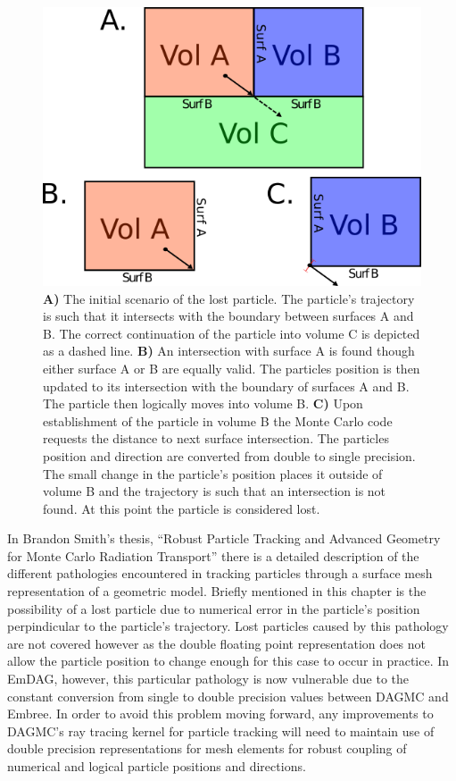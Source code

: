 \documentclass[12pt, a4paper]{article}
\begin{document}
\begin{figure}
  \begin{centering}
    \includegraphics[scale=0.7]{emdag_lost.png}
    \caption{\textbf{A)} The initial scenario of the lost particle. The particle's trajectory is such that it intersects with the boundary between surfaces A and B. The correct continuation of the particle into volume C is depicted as a dashed line. \textbf{B)} An intersection with surface A is found though either surface A or B are equally valid. The particles position is then updated to its intersection with the boundary of surfaces A and B. The particle then logically moves into volume B. \textbf{C)} Upon establishment of the particle in volume B the Monte Carlo code requests the distance to next surface intersection. The particles position and direction are converted from double to single precision. The small change in the particle's position places it outside of volume B and the trajectory is such that an intersection is not found. At this point the particle is considered lost.}
    \label{emdag-lost-particles}
  \end{centering}
  \end{figure}

In Brandon Smith's thesis, ``Robust Particle Tracking and Advanced Geometry for Monte Carlo Radiation Transport'' \cite{Smith_2011} there is a detailed description of the different pathologies encountered in tracking particles through a surface mesh representation of a geometric model. Briefly mentioned in this chapter is the possibility of a lost particle due to numerical error in the particle's position perpindicular to the particle's trajectory. Lost particles caused by this pathology are not covered however as the double floating point representation does not allow the particle position to change enough for this case to occur in practice. In EmDAG, however, this particular pathology is now vulnerable due to the constant conversion from single to double precision values between DAGMC and Embree. In order to avoid this problem moving forward, any improvements to DAGMC's ray tracing kernel for particle tracking will need to maintain use of double precision representations for mesh elements for robust coupling of numerical and logical particle positions and directions.
\end{document}
